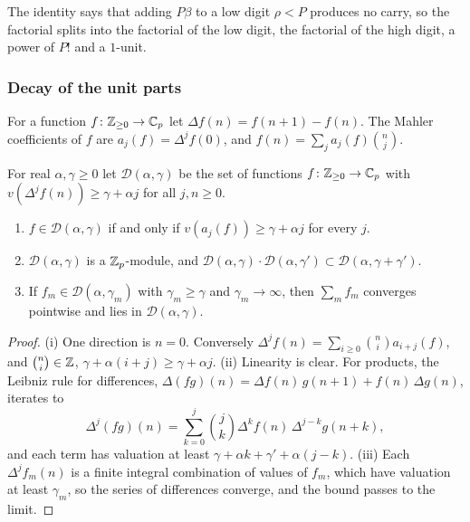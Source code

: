 The identity says that adding $P\beta$ to a low digit $\rho<P$ produces no carry, so the factorial splits into the factorial of the low digit, the factorial of the high digit, a power of $P!$ and a $1$-unit.

\subsubsection{Decay of the unit parts}

For a function $f\colon\mathbb Z_{\ge0}\to\mathbb C_p$ let $\Delta f(n)=f(n+1)-f(n)$. The Mahler coefficients of $f$ are $a_j(f)=\Delta^jf(0)$, and $f(n)=\sum_ja_j(f)\binom nj$.

\begin{definition}
For real $\alpha,\gamma\ge0$ let $\mathcal D(\alpha,\gamma)$ be the set of functions $f\colon\mathbb Z_{\ge0}\to\mathbb C_p$ with $v(\Delta^jf(n))\ge\gamma+\alpha j$ for all $j,n\ge0$.
\end{definition}

\begin{lemma}\label{w1:lem:Dring}
\begin{enumerate}[label=\textup{(\roman*)}]
\item $f\in\mathcal D(\alpha,\gamma)$ if and only if $v(a_j(f))\ge\gamma+\alpha j$ for every $j$.
\item $\mathcal D(\alpha,\gamma)$ is a $\mathbb Z_p$-module, and $\mathcal D(\alpha,\gamma)\cdot\mathcal D(\alpha,\gamma')\subset\mathcal D(\alpha,\gamma+\gamma')$.
\item If $f_m\in\mathcal D(\alpha,\gamma_m)$ with $\gamma_m\ge\gamma$ and $\gamma_m\to\infty$, then $\sum_mf_m$ converges pointwise and lies in $\mathcal D(\alpha,\gamma)$.
\end{enumerate}
\end{lemma}

\begin{proof}
(i) One direction is $n=0$. Conversely $\Delta^jf(n)=\sum_{i\ge0}\binom ni a_{i+j}(f)$, and $\binom ni\in\mathbb Z$, $\gamma+\alpha(i+j)\ge\gamma+\alpha j$. (ii) Linearity is clear. For products, the Leibniz rule for differences, $\Delta(fg)(n)=\Delta f(n)\,g(n+1)+f(n)\,\Delta g(n)$, iterates to
\[
\Delta^j(fg)(n)=\sum_{k=0}^j\binom jk\Delta^kf(n)\,\Delta^{j-k}g(n+k),
\]
and each term has valuation at least $\gamma+\alpha k+\gamma'+\alpha(j-k)$. (iii) Each $\Delta^jf_m(n)$ is a finite integral combination of values of $f_m$, which have valuation at least $\gamma_m$, so the series of differences converge, and the bound passes to the limit.
\end{proof}

